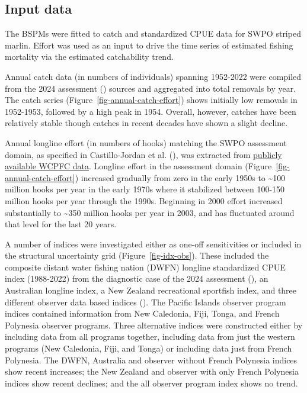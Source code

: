 \documentclass[
  11pt,
]{SCreport}
\begin{document}
\subsection{Input data}\label{sec-input-data}

The BSPMs were fitted to catch and standardized CPUE data for SWPO
striped marlin. Effort was used as an input to drive the time series of
estimated fishing mortality via the estimated catchability trend.

Annual catch data (in numbers of individuals) spanning 1952-2022 were
compiled from the 2024 assessment
() sources and aggregated into total removals by year. The catch
series (Figure~\ref{fig-annual-catch-effort}) shows initially low
removals in 1952-1953, followed by a high peak in 1954. Overall,
however, catches have been relatively stable though catches in recent
decades have shown a slight decline.

Annual longline effort (in numbers of hooks) matching the SWPO
assessment domain, as specified in Castillo-Jordan et al.
(), was extracted from
\href{https://www.wcpfc.int/node/4648}{publicly available WCPFC data}.
Longline effort in the assessment domain
(Figure~\ref{fig-annual-catch-effort}) increased gradually from zero in
the early 1950s to \textasciitilde100 million hooks per year in the
early 1970s where it stabilized between 100-150 million hooks per year
through the 1990s. Beginning in 2000 effort increased substantially to
\textasciitilde350 million hooks per year in 2003, and has fluctuated
around that level for the last 20 years.

A number of indices were investigated either as one-off sensitivities or
included in the structural uncertainty grid (Figure~\ref{fig-idx-obs}).
These included the composite distant water fishing nation (DWFN)
longline standardized CPUE index (1988-2022) from the diagnostic case of
the 2024 assessment
(), an Australian longline index, a New Zealand recreational
sportfish index, and three different observer data based indices
(). The
Pacific Islands observer program indices contained information from New
Caledonia, Fiji, Tonga, and French Polynesia observer programs. Three
alternative indices were constructed either by including data from all
programs together, including data from just the western programs (New
Caledonia, Fiji, and Tonga) or including data just from French
Polynesia. The DWFN, Australia and observer without French Polynesia
indices show recent increases; the New Zealand and observer with only
French Polynesia indices show recent declines; and the all observer
program index shows no trend.
\end{document}
